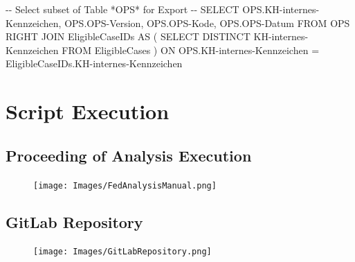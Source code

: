 \documentclass[
  letterpaper,
  DIV=11,
  numbers=noendperiod]{scrreprt}
\newenvironment{Shaded}{\begin{snugshade}}{\end{snugshade}}
\newcommand{\CommentTok}[1]{\textcolor[rgb]{0.37,0.37,0.37}{#1}}
\newcommand{\KeywordTok}[1]{\textcolor[rgb]{0.00,0.23,0.31}{#1}}
\newcommand{\NormalTok}[1]{\textcolor[rgb]{0.00,0.23,0.31}{#1}}
\newcommand{\OperatorTok}[1]{\textcolor[rgb]{0.37,0.37,0.37}{#1}}
\begin{document}
\begin{Shaded}
\begin{Highlighting}[]
\CommentTok{{-}{-} Select subset of Table *OPS* for Export {-}{-}}
\KeywordTok{SELECT}\NormalTok{ OPS.KH}\OperatorTok{{-}}\NormalTok{internes}\OperatorTok{{-}}\NormalTok{Kennzeichen,}
\NormalTok{       OPS.OPS}\OperatorTok{{-}}\NormalTok{Version,}
\NormalTok{       OPS.OPS}\OperatorTok{{-}}\NormalTok{Kode,}
\NormalTok{       OPS.OPS}\OperatorTok{{-}}\NormalTok{Datum}
\KeywordTok{FROM}\NormalTok{ OPS }\KeywordTok{RIGHT} \KeywordTok{JOIN}\NormalTok{ EligibleCaseIDs }\KeywordTok{AS}
\NormalTok{                    ( }\KeywordTok{SELECT} \KeywordTok{DISTINCT}\NormalTok{ KH}\OperatorTok{{-}}\NormalTok{internes}\OperatorTok{{-}}\NormalTok{Kennzeichen }\KeywordTok{FROM}\NormalTok{ EligibleCases )}
         \KeywordTok{ON}\NormalTok{ OPS.KH}\OperatorTok{{-}}\NormalTok{internes}\OperatorTok{{-}}\NormalTok{Kennzeichen }\OperatorTok{=}\NormalTok{ EligibleCaseIDs.KH}\OperatorTok{{-}}\NormalTok{internes}\OperatorTok{{-}}\NormalTok{Kennzeichen}

\end{Highlighting}
\end{Shaded}

\hypertarget{script-execution}{%
\chapter{Script Execution}\label{script-execution}}

\hfill\break

\hypertarget{proceeding-of-analysis-execution}{%
\section{Proceeding of Analysis
Execution}\label{proceeding-of-analysis-execution}}

\begin{figure}

{\centering \texttt{[image: Images/FedAnalysisManual.png]}

}

\end{figure}

\hypertarget{gitlab-repository}{%
\section{GitLab Repository}\label{gitlab-repository}}

\begin{figure}

{\centering \texttt{[image: Images/GitLabRepository.png]}

}

\end{figure}
\end{document}
